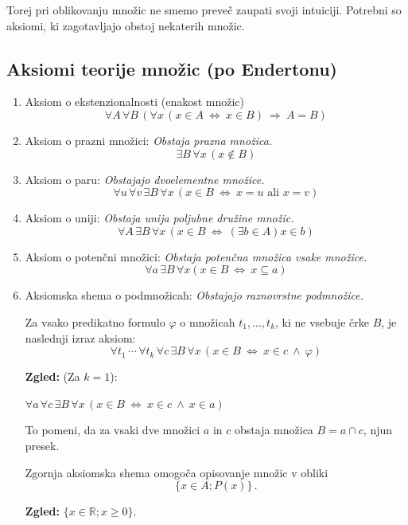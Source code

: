 \documentclass[11pt,paper=b5,footinclude,headinclude]{scrbook} %
\def\inn {{~\wedge~}}
\def\sledi {{~\Rightarrow~}}
\def\cee {{~\Leftrightarrow~}}
\def\zgled{\noindent\textbf{\color{blue} Zgled: }}
\begin{document}
\medskip
Torej pri oblikovanju množic ne smemo preveč zaupati svoji intuiciji. Potrebni so aksiomi, ki zagotavljajo obstoj nekaterih množic.

\subsection{Aksiomi teorije množic (po Endertonu)}

\begin{enumerate}
  \item Aksiom o ekstenzionalnosti (enakost množic)
  $$\forall A\, \forall B\, (\forall x \,(x\in A \cee x\in B) \sledi A = B)$$

  \item Aksiom o prazni množici:
  \emph{ Obstaja prazna množica.}
  $$\exists B\, \forall x\, (x\not \in B)$$

  \item Aksiom o paru: \emph{ Obstajajo dvoelementne množice.}
    $$\forall u\, \forall v\, \exists B\, \forall x\, (x\in B \cee x = u\textrm{ ali }x = v)$$

  \item Aksiom o uniji: \emph{ Obstaja unija poljubne družine množic.}
    $$\forall A\, \exists B\, \forall x\, (x\in B \cee (\exists b\in A) x\in b)$$

  \item Aksiom o potenčni množici: \emph{ Obstaja potenčna množica vsake množice.}
    $$\forall a\, \exists B\, \forall x (x\in B \cee x\subseteq a)$$

  \item Aksiomska shema o podmnožicah: \emph{ Obstajajo raznovrstne podmnožice.}

  Za vsako predikatno formulo $\varphi$ o množicah $t_1,\ldots, t_k$, ki ne vsebuje črke $B$, je naslednji izraz aksiom:
$$\forall t_1\,\cdots\, \forall t_k\,\forall c\,\exists B \,\forall x \,(x\in B \cee x\in c \inn \varphi)$$

\zgled
(Za $k = 1$):

$\forall a \,\forall c \,\exists B \, \forall x\, (x\in B \cee x\in c \inn x\in a)$

To pomeni, da za vsaki dve množici $a$ in $c$ obstaja množica $B = a\cap c$, njun presek.

\medskip
Zgornja aksiomska shema omogoča opisovanje množic v obliki
$$\{x\in A; P(x)\}\,.$$

\zgled $\{x\in \mathbb{R}; x\ge 0\}$.


\end{enumerate}
\end{document}
